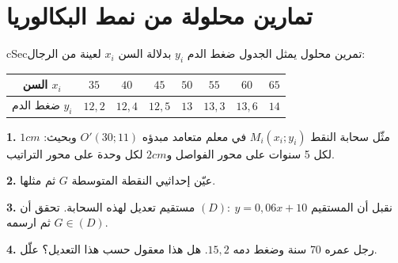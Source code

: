 \documentclass[12pt,a4paper]{article}
\newenvironment{BOX}[2]{\begin{otherlanguage}{english}\begin{arbox}{#1}{#2}}{\end{arbox}\end{otherlanguage}}
\newcounter{exo}
\newcommand{\QQ}[1]{\par\smallskip\textbf{#1.} }
\newenvironment{tmr}{\stepcounter{exo}\begin{BOX}{cSec}{تمرين محلول \theexo}}{\end{BOX}}
\let\origNeedspace\Needspace
\renewcommand{\Needspace}[1]{\origNeedspace{14\baselineskip}}
\begin{document}
\origNeedspace{26\baselineskip}\section{تمارين محلولة من نمط البكالوريا}
\begin{tmr}
يمثل الجدول ضغط الدم $y_i$ بدلالة السن $x_i$ لعينة من الرجال:
\begin{center}
\begin{tabular}{|C|c|c|c|c|c|c|c|}\hline
{} السن $x_i$ & $35$ & $40$ & $45$ & $50$ & $55$ & $60$ & $65$\\\hline
ضغط الدم $y_i$ & $12,2$ & $12,4$ & $12,5$ & $13$ & $13,3$ & $13,6$ & $14$\\\hline
\end{tabular}
\end{center}
\QQ{1} مثّل سحابة النقط $M_i(x_i;y_i)$ في معلم متعامد مبدؤه $O'(30;11)$ وبحيث: $1cm$ لكل 5 سنوات على محور الفواصل و$2cm$ لكل وحدة على محور التراتيب.
\QQ{2} عيّن إحداثيي النقطة المتوسطة $G$ ثم مثلها.
\QQ{3} نقبل أن المستقيم $(D):\ y=0,06x+10$ مستقيم تعديل لهذه السحابة. تحقق أن $G\in(D)$ ثم ارسمه.
\QQ{4} رجل عمره 70 سنة وضغط دمه $15,2$. هل هذا معقول حسب هذا التعديل؟ علّل.
\end{tmr}
\end{document}
